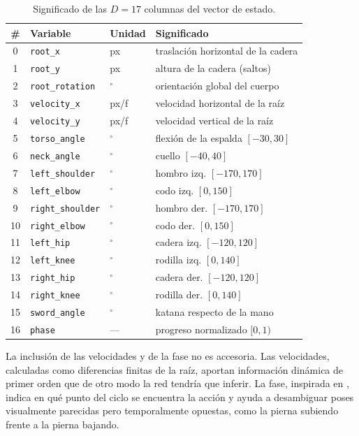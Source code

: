\documentclass[10pt,twocolumn]{article}
\begin{document}
\begin{table}[t]
\centering
\scriptsize
\caption{Significado de las $D=17$ columnas del vector de estado.}
\label{tab:estado}
\begin{tabular}{@{}clll@{}}
\toprule
\# & Variable & Unidad & Significado \\
\midrule
0  & \texttt{root\_x}         & px & traslación horizontal de la cadera \\
1  & \texttt{root\_y}         & px & altura de la cadera (saltos) \\
2  & \texttt{root\_rotation}  & $^\circ$ & orientación global del cuerpo \\
3  & \texttt{velocity\_x}     & px/f & velocidad horizontal de la raíz \\
4  & \texttt{velocity\_y}     & px/f & velocidad vertical de la raíz \\
5  & \texttt{torso\_angle}    & $^\circ$ & flexión de la espalda $[-30,30]$ \\
6  & \texttt{neck\_angle}     & $^\circ$ & cuello $[-40,40]$ \\
7  & \texttt{left\_shoulder}  & $^\circ$ & hombro izq. $[-170,170]$ \\
8  & \texttt{left\_elbow}     & $^\circ$ & codo izq. $[0,150]$ \\
9  & \texttt{right\_shoulder} & $^\circ$ & hombro der. $[-170,170]$ \\
10 & \texttt{right\_elbow}    & $^\circ$ & codo der. $[0,150]$ \\
11 & \texttt{left\_hip}       & $^\circ$ & cadera izq. $[-120,120]$ \\
12 & \texttt{left\_knee}      & $^\circ$ & rodilla izq. $[0,140]$ \\
13 & \texttt{right\_hip}      & $^\circ$ & cadera der. $[-120,120]$ \\
14 & \texttt{right\_knee}     & $^\circ$ & rodilla der. $[0,140]$ \\
15 & \texttt{sword\_angle}    & $^\circ$ & katana respecto de la mano \\
16 & \texttt{phase}           & --- & progreso normalizado $[0,1)$ \\
\bottomrule
\end{tabular}
\end{table}

La inclusión de las velocidades y de la fase no es accesoria. Las velocidades,
calculadas como diferencias finitas de la raíz, aportan información dinámica de
primer orden que de otro modo la red tendría que inferir. La fase, inspirada en
\cite{pfnn}, indica en qué punto del ciclo se encuentra la acción y ayuda a
desambiguar poses visualmente parecidas pero temporalmente opuestas, como la
pierna subiendo frente a la pierna bajando.
\end{document}
